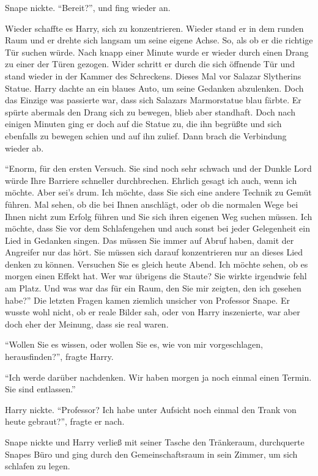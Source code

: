 Snape nickte. \enquote{Bereit?}, und fing wieder an. 

Wieder schaffte es Harry, sich zu konzentrieren. Wieder stand er in dem runden Raum und er drehte sich langsam um seine eigene Achse. So, als ob er die richtige Tür suchen würde. Nach knapp einer Minute wurde er wieder durch einen Drang zu einer der Türen gezogen. Wider schritt er durch die sich öffnende Tür und stand wieder in der Kammer des Schreckens. Dieses Mal vor Salazar Slytherins Statue. Harry dachte an ein blaues Auto, um seine Gedanken abzulenken. Doch das Einzige was passierte war, dass sich Salazars Marmorstatue blau färbte. Er spürte abermals den Drang sich zu bewegen, blieb aber standhaft. Doch nach einigen Minuten ging er doch auf die Statue zu, die ihn begrüßte und sich ebenfalls zu bewegen schien und auf ihn zulief. Dann brach die Verbindung wieder ab.

\enquote{Enorm, für den ersten Versuch. Sie sind noch sehr schwach und der Dunkle Lord würde Ihre Barriere schneller durchbrechen. Ehrlich gesagt ich auch, wenn ich möchte. Aber sei’s drum. Ich möchte, dass Sie sich eine andere Technik zu Gemüt führen. Mal sehen, ob die bei Ihnen anschlägt, oder ob die normalen Wege bei Ihnen nicht zum Erfolg führen und Sie sich ihren eigenen Weg suchen müssen. Ich möchte, dass Sie vor dem Schlafengehen und auch sonst bei jeder Gelegenheit ein Lied in Gedanken singen. Das müssen Sie immer auf Abruf haben, damit der Angreifer nur das hört. Sie müssen sich darauf konzentrieren nur an dieses Lied denken zu können. Versuchen Sie es gleich heute Abend. Ich möchte sehen, ob es morgen einen Effekt hat. \gst Wer war übrigens die Staute? Sie wirkte irgendwie fehl am Platz. Und was war das für ein Raum, den Sie mir zeigten, den ich gesehen habe?} Die letzten Fragen kamen ziemlich unsicher von Professor Snape. Er wusste wohl nicht, ob er reale Bilder sah, oder von Harry inszenierte, war aber doch eher der Meinung, dass sie real waren.

\enquote{Wollen Sie es wissen, oder wollen Sie es, wie von mir vorgeschlagen, herausfinden?}, fragte Harry.

\enquote{Ich werde darüber nachdenken. Wir haben morgen ja noch einmal einen Termin. Sie sind entlassen.}

Harry nickte. \enquote{Professor? Ich habe unter Aufsicht noch einmal den Trank von heute gebraut?}, fragte er nach.

Snape nickte und Harry verließ mit seiner Tasche den Tränkeraum, durchquerte Snapes Büro und ging durch den Gemeinschaftsraum in sein Zimmer, um sich schlafen zu legen.

